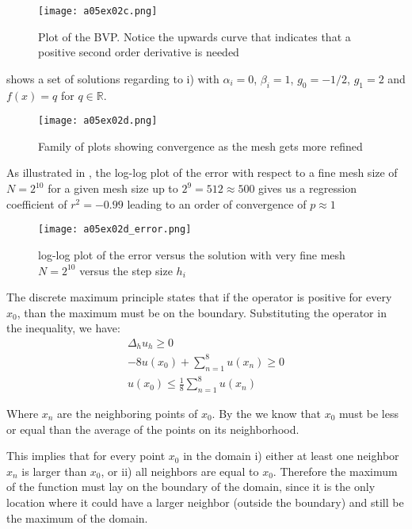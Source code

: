 \begin{figure}[H]
	\centering
	\texttt{[image: a05ex02c.png]} 
	\caption{Plot of the BVP. Notice the upwards curve that indicates that a positive second order derivative is needed }
	\label{fig:a05ex02b}
\end{figure}

 shows a set of solutions regarding to i) with $\alpha_i = 0$, $\beta_i = 1$, $g_0 = -1/2$, $g_1=2$ and $f(x) = q$ for $q \in \mathbb{R}$.
\begin{figure}[H]
	\centering
	\texttt{[image: a05ex02d.png]} 
	\caption{Family of plots showing convergence as the mesh gets more refined }
	\label{fig:a05ex02c}
\end{figure}


As illustrated in , the log-log plot of the error with respect to a fine mesh size of $N=2^{10}$ for a given mesh size up to $2^9=512 \approx 500$ gives us a regression coefficient of $r^2=-0.99$ leading to an order of convergence of $p \approx 1$

\begin{figure}[H]
	\centering
	\texttt{[image: a05ex02d\_error.png]} 
	\caption{log-log plot of the error versus the solution with very fine mesh $N=2^{10}$ versus the step size $h_i$ }
	\label{fig:a05ex02d}
\end{figure}



%
%
The discrete maximum principle states that if the operator is positive for every $x_0$, than the maximum must be on the boundary. Substituting the operator in the inequality, we have:
\begin{gather}
    \Delta_h u_h \ge 0 \nonumber\\
    -8 u(x_0) + \sum_{n=1}^{8} u(x_n) \ge 0 \nonumber\\
    u(x_0) \le  \frac{1}{8} \sum_{n=1}^{8} u(x_n)
    \label{e3eq1}
\end{gather}

Where $x_n$ are the neighboring points of $x_0$. By the  we know that $x_0$ must be less or equal than the average of the points on its neighborhood.

This implies that for every point $x_0$ in the domain i) either at least one neighbor $x_n$ is larger than $x_0$, or ii)  all neighbors are equal to $x_0$. Therefore the maximum of the function must lay on the boundary of the domain, since it is the only location where it could have a larger neighbor (outside the boundary) and still be the maximum of the domain.
%

%
%
